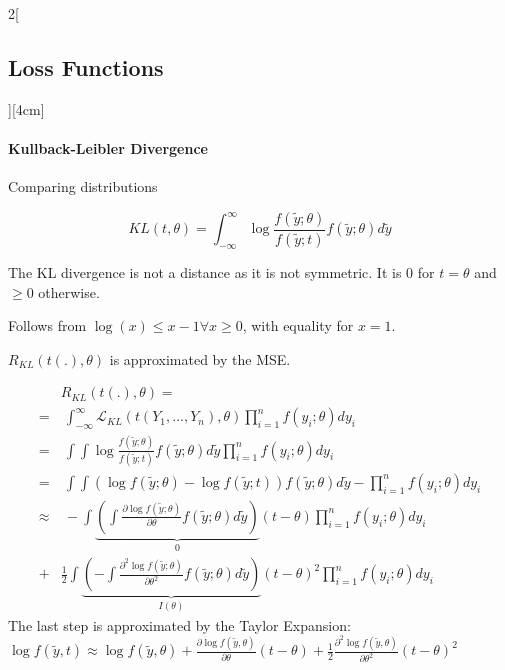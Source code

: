 \documentclass[8pt]{extarticle}
\begin{document}
\begin{multicols}{2}[\subsection{Loss Functions}][4cm]
\paragraph{Kullback-Leibler Divergence} Comparing distributions

$$KL(t,\theta) = \int_{-\infty}^\infty \log\frac{f(\tilde{y};\theta)}{f(\tilde{y};t)} f(\tilde{y};\theta) d\tilde{y}$$

\noindent The KL divergence is not a distance as it is not symmetric.
\noindent It is $0$ for $t=\theta$ and $\geq 0$ otherwise.
\begin{Proof}
Follows from $\log (x) \leq x-1 \forall x \geq 0$, with equality for $x=1$.
\end{Proof}

\noindent $R_{KL} (t(.), \theta)$ is approximated by the MSE.
\begin{Proof}
\vspace{-1.5em}
\begin{align*}
& R_{KL} (t(.), \theta) = \\ =&\: \int_{-\infty}^\infty \mathcal{L}_{KL}(t(Y_1,...,Y_n),\theta) \prod_{i=1}^n f(y_i;\theta)dy_i \\
=&\: \int\int \log\frac{f(\tilde{y};\theta)}{f(\tilde{y};t)} f(\tilde{y};\theta) d\tilde{y} \prod_{i=1}^n f(y_i;\theta)dy_i \\
=&\: \int\int \left(\log f(\tilde{y};\theta) - \log f(\tilde{y};t) \right) f(\tilde{y};\theta) d\tilde{y} - \prod_{i=1}^n f(y_i;\theta)dy_i \\
\approx & \: - \int \underbrace{\left( \int \frac{\partial \log f(\tilde{y};\theta)}{\partial \theta} f(\tilde{y};\theta)d\tilde{y}\right)}_{0}\left(t-\theta\right) \prod_{i=1}^n f(y_i;\theta)dy_i  \\
+ &  \frac{1}{2} \int \underbrace{\left( - \int \frac{\partial^2 \log f(\tilde{y};\theta)}{\partial \theta^2} f(\tilde{y};\theta)d\tilde{y}\right)}_{I(\theta)}\left(t-\theta\right)^2 \prod_{i=1}^n f(y_i;\theta)dy_i 
\end{align*}
The last step is approximated by the Taylor Expansion:
$\log f(\tilde{y}, t) \approx \log f(\tilde{y},\theta) {+} \frac{\partial\log f(\tilde{y}, \theta)}{\partial\theta} (t{-}\theta) {+} \frac{1}{2} \frac{\partial^2\log f(\tilde{y}, \theta)}{\partial\theta^2} (t{-}\theta)^2$
\end{Proof}
\end{multicols}
\end{document}
